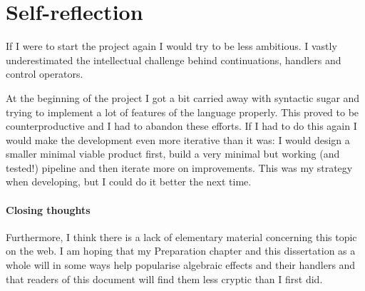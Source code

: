 \documentclass[class=article, crop=false]{standalone}
\begin{document}
\section{Self-reflection}

If I were to start the project again I would try to be less ambitious. I vastly
underestimated the intellectual challenge behind continuations, handlers and
control operators.

At the beginning of the project I got a bit carried away with syntactic sugar
and trying to implement a lot of features of the language properly. This proved
to be counterproductive and I had to abandon these efforts. If I had to do this
again I would make the development even more iterative than it was: I would
design a smaller minimal viable product first, build a very minimal but working
(and tested!) pipeline and then iterate more on improvements. This was my
strategy when developing, but I could do it better the next time.

\paragraph{Closing thoughts}

Furthermore, I think there is a lack of elementary material concerning this
topic on the web. I am hoping that my Preparation chapter and this dissertation
as a whole will in some ways help popularise algebraic effects and their
handlers and that readers of this document will find them less cryptic than I
first did.
\end{document}
